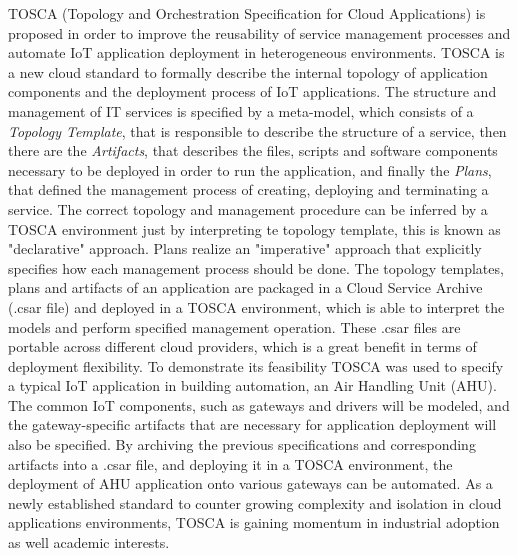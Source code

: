 TOSCA (Topology and Orchestration Specification for Cloud Applications) \cite{li2013towards} is proposed in order to improve the reusability of service management
processes and automate IoT application deployment in heterogeneous environments. TOSCA is a new cloud standard to formally describe the internal topology of
application components and the deployment process of IoT applications. The structure and management of IT services is specified by a meta-model, which consists
of a \textit{Topology Template}, that is responsible to describe the structure of a service, then there are the \textit{Artifacts}, that describes the files, scripts and
software components necessary to be deployed in order to run the application, and finally the \textit{Plans}, that defined the management process of creating, deploying and
terminating a service. The correct topology and management procedure can be inferred by a TOSCA environment just by interpreting te topology template, this is known
as "declarative" approach. Plans realize an "imperative" approach that explicitly specifies how each management process should be done. The topology templates, plans
and artifacts of an application are packaged in a Cloud Service Archive (.csar file) and deployed in a TOSCA environment, which is able to interpret the models and perform
specified management operation. These .csar files are portable across different cloud providers, which is a great benefit in terms of deployment flexibility.
To demonstrate its feasibility TOSCA was used to specify a typical IoT application in building automation, an Air Handling Unit (AHU). The common IoT components, such as gateways
and drivers will be modeled, and the gateway-specific artifacts that are necessary for application deployment will also be specified. By archiving the previous specifications
and corresponding artifacts into a .csar file, and deploying it in a TOSCA environment, the deployment of AHU application onto various gateways can be automated.
As a newly established standard to counter growing complexity and isolation in cloud applications environments, TOSCA is gaining momentum in industrial adoption as well academic interests.\\


